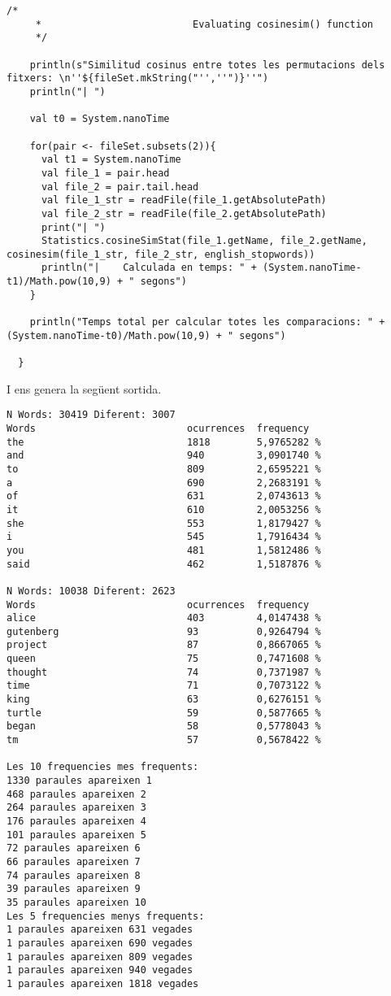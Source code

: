 \documentclass{report}
\begin{document}
\newpage

\begin{lstlisting}[style=scalaHighlight]
    /*
     * 							Evaluating cosinesim() function
     */

    println(s"Similitud cosinus entre totes les permutacions dels fitxers: \n''${fileSet.mkString("'',''")}''")
    println("| ")

    val t0 = System.nanoTime

    for(pair <- fileSet.subsets(2)){
      val t1 = System.nanoTime
      val file_1 = pair.head
      val file_2 = pair.tail.head
      val file_1_str = readFile(file_1.getAbsolutePath)
      val file_2_str = readFile(file_2.getAbsolutePath)
      print("| ")
      Statistics.cosineSimStat(file_1.getName, file_2.getName, cosinesim(file_1_str, file_2_str, english_stopwords))
      println("|	Calculada en temps: " + (System.nanoTime-t1)/Math.pow(10,9) + " segons")
    }

    println("Temps total per calcular totes les comparacions: " + (System.nanoTime-t0)/Math.pow(10,9) + " segons")

  }
\end{lstlisting}

\newpage

I ens genera la següent sortida. \\

\begin{verbatim}
N Words: 30419 Diferent: 3007
Words                          ocurrences  frequency
the                            1818        5,9765282 %
and                            940         3,0901740 %
to                             809         2,6595221 %
a                              690         2,2683191 %
of                             631         2,0743613 %
it                             610         2,0053256 %
she                            553         1,8179427 %
i                              545         1,7916434 %
you                            481         1,5812486 %
said                           462         1,5187876 %

N Words: 10038 Diferent: 2623
Words                          ocurrences  frequency
alice                          403         4,0147438 %
gutenberg                      93          0,9264794 %
project                        87          0,8667065 %
queen                          75          0,7471608 %
thought                        74          0,7371987 %
time                           71          0,7073122 %
king                           63          0,6276151 %
turtle                         59          0,5877665 %
began                          58          0,5778043 %
tm                             57          0,5678422 %

Les 10 frequencies mes frequents:
1330 paraules apareixen 1
468 paraules apareixen 2
264 paraules apareixen 3
176 paraules apareixen 4
101 paraules apareixen 5
72 paraules apareixen 6
66 paraules apareixen 7
74 paraules apareixen 8
39 paraules apareixen 9
35 paraules apareixen 10
Les 5 frequencies menys frequents:
1 paraules apareixen 631 vegades
1 paraules apareixen 690 vegades
1 paraules apareixen 809 vegades
1 paraules apareixen 940 vegades
1 paraules apareixen 1818 vegades
\end{verbatim}
\end{document}
